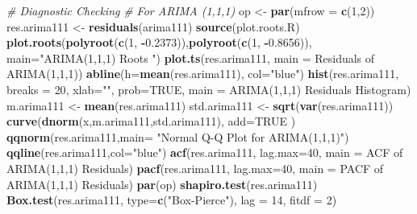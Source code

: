 \documentclass[
]{article}
\newenvironment{Shaded}{\begin{snugshade}}{\end{snugshade}}
\newcommand{\AttributeTok}[1]{\textcolor[rgb]{0.13,0.29,0.53}{#1}}
\newcommand{\CommentTok}[1]{\textcolor[rgb]{0.56,0.35,0.01}{\textit{#1}}}
\newcommand{\ConstantTok}[1]{\textcolor[rgb]{0.56,0.35,0.01}{#1}}
\newcommand{\DecValTok}[1]{\textcolor[rgb]{0.00,0.00,0.81}{#1}}
\newcommand{\FloatTok}[1]{\textcolor[rgb]{0.00,0.00,0.81}{#1}}
\newcommand{\FunctionTok}[1]{\textcolor[rgb]{0.13,0.29,0.53}{\textbf{#1}}}
\newcommand{\NormalTok}[1]{#1}
\newcommand{\OtherTok}[1]{\textcolor[rgb]{0.56,0.35,0.01}{#1}}
\newcommand{\SpecialCharTok}[1]{\textcolor[rgb]{0.81,0.36,0.00}{\textbf{#1}}}
\newcommand{\StringTok}[1]{\textcolor[rgb]{0.31,0.60,0.02}{#1}}
\begin{document}
\begin{Shaded}
\begin{Highlighting}[]
\CommentTok{\# Diagnostic Checking}
\CommentTok{\# For ARIMA (1,1,1)}
\NormalTok{op }\OtherTok{\textless{}{-}} \FunctionTok{par}\NormalTok{(}\AttributeTok{mfrow =} \FunctionTok{c}\NormalTok{(}\DecValTok{1}\NormalTok{,}\DecValTok{2}\NormalTok{))}
\NormalTok{res.arima111 }\OtherTok{\textless{}{-}} \FunctionTok{residuals}\NormalTok{(arima111)}
\FunctionTok{source}\NormalTok{(}\StringTok{\textquotesingle{}plot.roots.R\textquotesingle{}}\NormalTok{)}
\FunctionTok{plot.roots}\NormalTok{(}\FunctionTok{polyroot}\NormalTok{(}\FunctionTok{c}\NormalTok{(}\DecValTok{1}\NormalTok{, }\SpecialCharTok{{-}}\FloatTok{0.2373}\NormalTok{)),}\FunctionTok{polyroot}\NormalTok{(}\FunctionTok{c}\NormalTok{(}\DecValTok{1}\NormalTok{, }\SpecialCharTok{{-}}\FloatTok{0.8656}\NormalTok{)), }\AttributeTok{main=}\StringTok{"ARIMA(1,1,1) Roots "}\NormalTok{)}
\FunctionTok{plot.ts}\NormalTok{(res.arima111, }\AttributeTok{main =} \StringTok{\textquotesingle{}Residuals of ARIMA(1,1,1)\textquotesingle{}}\NormalTok{)}
\FunctionTok{abline}\NormalTok{(}\AttributeTok{h=}\FunctionTok{mean}\NormalTok{(res.arima111), }\AttributeTok{col=}\StringTok{"blue"}\NormalTok{)}
\FunctionTok{hist}\NormalTok{(res.arima111, }\AttributeTok{breaks =} \DecValTok{20}\NormalTok{, }\AttributeTok{xlab=}\StringTok{""}\NormalTok{, }\AttributeTok{prob=}\ConstantTok{TRUE}\NormalTok{, }
     \AttributeTok{main =} \StringTok{\textquotesingle{}ARIMA(1,1,1) Residuals Histogram\textquotesingle{}}\NormalTok{)}
\NormalTok{m.arima111 }\OtherTok{\textless{}{-}} \FunctionTok{mean}\NormalTok{(res.arima111)}
\NormalTok{std.arima111 }\OtherTok{\textless{}{-}} \FunctionTok{sqrt}\NormalTok{(}\FunctionTok{var}\NormalTok{(res.arima111))}
\FunctionTok{curve}\NormalTok{(}\FunctionTok{dnorm}\NormalTok{(x,m.arima111,std.arima111), }\AttributeTok{add=}\ConstantTok{TRUE}\NormalTok{ )}
\FunctionTok{qqnorm}\NormalTok{(res.arima111,}\AttributeTok{main=} \StringTok{"Normal Q{-}Q Plot for ARIMA(1,1,1)"}\NormalTok{)}
\FunctionTok{qqline}\NormalTok{(res.arima111,}\AttributeTok{col=}\StringTok{"blue"}\NormalTok{)}
\FunctionTok{acf}\NormalTok{(res.arima111, }\AttributeTok{lag.max=}\DecValTok{40}\NormalTok{, }\AttributeTok{main =} \StringTok{\textquotesingle{}ACF of ARIMA(1,1,1) Residuals\textquotesingle{}}\NormalTok{)}
\FunctionTok{pacf}\NormalTok{(res.arima111, }\AttributeTok{lag.max=}\DecValTok{40}\NormalTok{, }\AttributeTok{main =} \StringTok{\textquotesingle{}PACF of ARIMA(1,1,1) Residuals\textquotesingle{}}\NormalTok{)}
\FunctionTok{par}\NormalTok{(op)}
\FunctionTok{shapiro.test}\NormalTok{(res.arima111)}
\FunctionTok{Box.test}\NormalTok{(res.arima111, }\AttributeTok{type=}\FunctionTok{c}\NormalTok{(}\StringTok{"Box{-}Pierce"}\NormalTok{), }\AttributeTok{lag =} \DecValTok{14}\NormalTok{, }\AttributeTok{fitdf =} \DecValTok{2}\NormalTok{)}

\end{Highlighting}
\end{Shaded}
\end{document}
